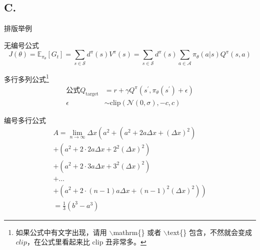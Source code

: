 \documentclass{beamer}
\begin{document}
\subsection{C. }
\begin{frame}{排版举例}
    \begin{exampleblock}{无编号公式} %
        \begin{equation*}
            J(\theta) = \mathbb{E}_{\pi_\theta}[G_t] = \sum_{s\in\mathcal{S}} d^\pi (s)V^\pi(s)=\sum_{s\in\mathcal{S}} d^\pi(s)\sum_{a\in\mathcal{A}}\pi_\theta(a|s)Q^\pi(s,a)
        \end{equation*}
    \end{exampleblock}
    \begin{exampleblock}{多行多列公式\footnote{如果公式中有文字出现，请用 $\backslash$mathrm\{\} 或者 $\backslash$text\{\} 包含，不然就会变成 $clip$，在公式里看起来比 $\mathrm{clip}$ 丑非常多。}}
        \begin{align}
            公式Q_\mathrm{target}&=r+\gamma Q^\pi(s^\prime, \pi_\theta(s^\prime)+\epsilon)\\
            \epsilon&\sim\mathrm{clip}(\mathcal{N}(0, \sigma), -c, c)\nonumber
        \end{align}
    \end{exampleblock}
\end{frame}

\begin{frame}
    \begin{exampleblock}{编号多行公式}
        \begin{multline}
            A=\lim_{n\rightarrow\infty}\Delta x\left(a^{2}+\left(a^{2}+2a\Delta x+\left(\Delta x\right)^{2}\right)\right.\label{eq:reset}\\
            +\left(a^{2}+2\cdot2a\Delta x+2^{2}\left(\Delta x\right)^{2}\right)\\
            +\left(a^{2}+2\cdot3a\Delta x+3^{2}\left(\Delta x\right)^{2}\right)\\
            +\ldots\\
            \left.+\left(a^{2}+2\cdot(n-1)a\Delta x+(n-1)^{2}\left(\Delta x\right)^{2}\right)\right)\\
            =\frac{1}{3}\left(b^{3}-a^{3}\right)
        \end{multline}
    \end{exampleblock}
\end{frame}
\end{document}
